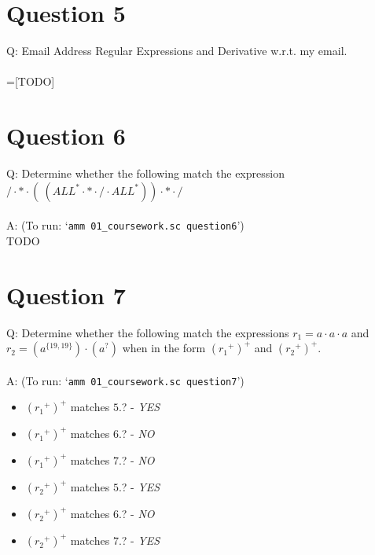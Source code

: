 \documentclass[english]{scrartcl}
\begin{document}
\section*{Question 5}
Q: Email Address Regular Expressions and Derivative w.r.t. my email.
\\
\\
=[TODO]

\section*{Question 6}
Q: Determine whether the following match the expression
$ / \cdot * \cdot (~(ALL^* \cdot * \cdot / \cdot ALL^*)) \cdot * \cdot /$
\\
\\
A: (To run: `\verb|amm 01_coursework.sc question6|') \\
TODO

\section*{Question 7}
Q: Determine whether the following match the expressions $ r_1 = a \cdot a \cdot a$ and
$ r_2 = (a^{\{19,19\}}) \cdot (a^?)$ when in the form $({r_1}^+)^+$ and $({r_2}^+)^+$.
\\
\\
A: (To run: `\verb|amm 01_coursework.sc question7|')
\begin{itemize}
    \item $({r_1}^+)^+$ matches $5.$? - \textit{YES}
    \item $({r_1}^+)^+$ matches $6.$? - \textit{NO}
    \item $({r_1}^+)^+$ matches $7.$? - \textit{NO}
    \item $({r_2}^+)^+$ matches $5.$? - \textit{YES}
    \item $({r_2}^+)^+$ matches $6.$? - \textit{NO}
    \item $({r_2}^+)^+$ matches $7.$? - \textit{YES}
\end{itemize}
\end{document}
